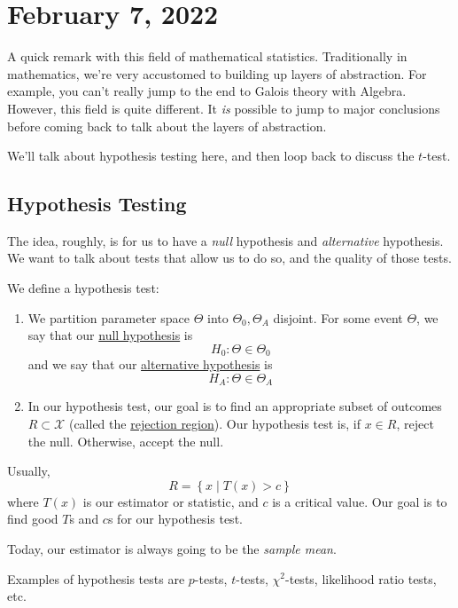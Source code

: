 \section{February 7, 2022}
A quick remark with this field of mathematical statistics. Traditionally in mathematics, we're very accustomed to building up layers of abstraction. For example, you can't really jump to the end to Galois theory with Algebra. However, this field is quite different. It \emph{is} possible to jump to major conclusions before coming back to talk about the layers of abstraction.

We'll talk about hypothesis testing here, and then loop back to discuss the $t$-test.

\subsection{Hypothesis Testing}
The idea, roughly, is for us to have a \emph{null} hypothesis and \emph{alternative} hypothesis. We want to talk about tests that allow us to do so, and the quality of those tests.

\begin{definition}
    We define a hypothesis test:
    \begin{enumerate}
        \item We partition parameter space $\Theta$ into $\Theta_0, \Theta_A$ disjoint. For some event $\Theta$, we say that our \ul{null hypothesis} is
              \[H_0 : \Theta\in\Theta_0\]
              and we say that our \ul{alternative hypothesis} is
              \[H_A : \Theta\in\Theta_A\]
        \item In our hypothesis test, our goal is to find an appropriate subset of outcomes $R\subset \mathcal{X}$ (called the \ul{rejection region}). Our hypothesis test is, if $x\in R$, reject the null. Otherwise, accept the null.
    \end{enumerate}
\end{definition}

Usually,
\[R = \left\{ x\mid T(x) > c \right\}\]
where $T(x)$ is our estimator or statistic, and $c$ is a critical value. Our goal is to find good $T$s and $c$s for our hypothesis test.

Today, our estimator is always going to be the \emph{sample mean}.

\begin{example*}
    Examples of hypothesis tests are $p$-tests, $t$-tests, $\chi^2$-tests, likelihood ratio tests, etc.
\end{example*}


